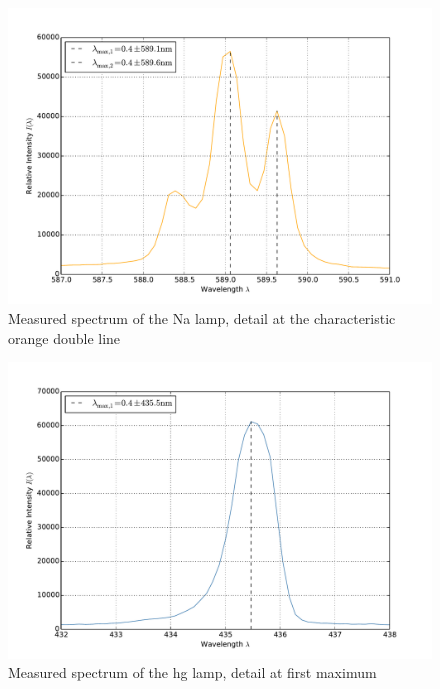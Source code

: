 \begin{figure}
\centering
\includegraphics[width=\pltw]{analysis/figures/na_max.pdf}
\caption{Measured spectrum of the Na lamp, detail at the 
characteristic orange double line}
\label{fig:na_max}
\end{figure}

\begin{figure}
\centering
\includegraphics[width=\pltw]{analysis/figures/hg1_max.pdf}
\caption{Measured spectrum of the hg lamp, detail at first maximum}
\label{fig:hg1_max}
\end{figure}

